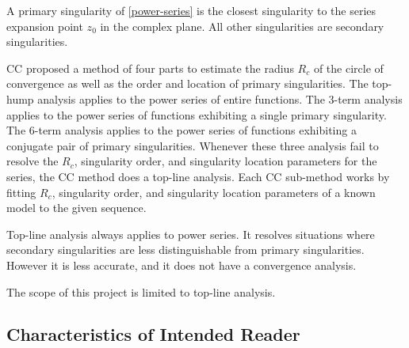 \documentclass[12pt]{article}
\begin{document}
A primary singularity of \eqref{power-series} is the closest singularity to the series
expansion point $z_0$ in the complex plane. All other singularities are secondary singularities.

CC proposed a method of four parts to estimate the radius $R_c$ of the circle of convergence
as well as the order and location of primary singularities. The top-hump analysis applies to
the power series of entire functions. The 3-term analysis applies to the power series of
functions exhibiting a single primary singularity. The 6-term analysis applies to the
power series of functions exhibiting a conjugate pair of primary singularities.
Whenever these three analysis fail to resolve the $R_c$, singularity order, and
singularity location parameters for the series, the CC method does
a top-line analysis. Each CC sub-method works by fitting $R_c$, singularity order, and
singularity location parameters of a known model to the given sequence.

Top-line analysis always applies to power series. It resolves situations where secondary singularities are
less distinguishable from primary singularities. However it is less accurate, and it does
not have a convergence analysis.

The scope of this  project is limited to top-line analysis.



\subsection{Characteristics of Intended Reader} \label{sec_IntendedReader}
\end{document}
